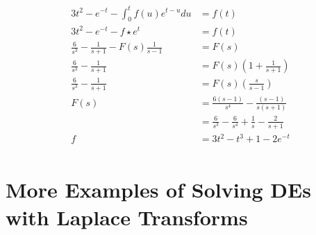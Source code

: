 \documentclass[fleqn,letterpaper]{report}
\begin{document}
\begin{align*} 
3t^2 - e^{-t} - \int_0^t f(u) e^{t-u} du & = f(t) \\
3t^2 - e^{-t} - f \star e^t & = f(t) \\
\frac{6}{s^3} - \frac{1}{s+1} - F(s) \frac{1}{s-1} & = F(s) \\
\frac{6}{s^3} - \frac{1}{s+1} & = F(s) \left( 1 + \frac{1}{s+1}
\right) \\
\frac{6}{s^3} - \frac{1}{s+1} & = F(s) \left( \frac{s}{s-1}
\right) \\
F(s) & = \frac{6(s-1)}{s^4} - \frac{(s-1)}{s(s+1)} \\
& = \frac{6}{s^3} - \frac{6}{s^4} + \frac{1}{s} - \frac{2}{s+1}
\\
f & = 3t^2 - t^3 + 1 - 2e^{-t} \\
\end{align*}

\section{More Examples of Solving DEs with Laplace
Transforms}
\label{laplace-examples}
\end{document}
